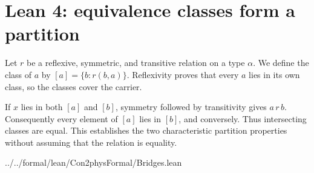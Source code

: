\section{Lean 4: equivalence classes form a partition}
\label{sec:lean-bridge-05}
Let $r$ be a reflexive, symmetric, and transitive relation on a
type $\alpha$. We define the class of $a$ by
$[a]=\{b:r(b,a)\}$. Reflexivity proves that every $a$ lies
in its own class, so the classes cover the carrier.

If $x$ lies in both $[a]$ and $[b]$, symmetry followed by
transitivity gives $a\,r\,b$. Consequently every element of
$[a]$ lies in $[b]$, and conversely. Thus intersecting
classes are equal. This establishes the two characteristic
partition properties without assuming that the relation is
equality.


{../../formal/lean/Con2physFormal/Bridges.lean}
